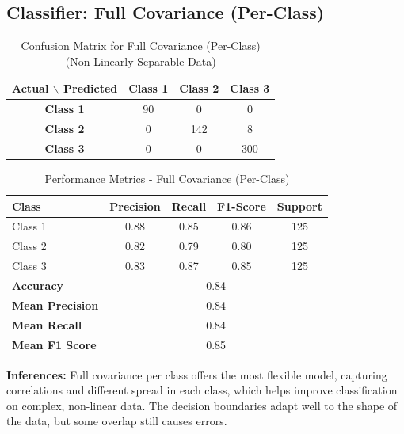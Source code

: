 \subsection{Classifier: Full Covariance (Per-Class)}


\begin{table}[H]
\centering
\caption{Confusion Matrix for Full Covariance (Per-Class) (Non-Linearly Separable Data)}
\label{tab:confmat_d3_sigma2I}
\begin{tabular}{|c|c|c|c|}
\hline
\textbf{Actual $\backslash$ Predicted} & \textbf{Class 1} & \textbf{Class 2} & \textbf{Class 3} \\
\hline
\textbf{Class 1} & 90 & 0   & 0   \\
\textbf{Class 2} & 0  & 142 & 8   \\
\textbf{Class 3} & 0   & 0   & 300 \\
\hline
\end{tabular}
\end{table}


\begin{table}[H]
\centering
\caption{Performance Metrics - Full Covariance (Per-Class)}
\begin{tabular}{lcccc}
\toprule
\textbf{Class} & \textbf{Precision} & \textbf{Recall} & \textbf{F1-Score} & \textbf{Support} \\
\midrule
Class 1 & 0.88 & 0.85 & 0.86 & 125 \\
Class 2 & 0.82 & 0.79 & 0.80 & 125 \\
Class 3 & 0.83 & 0.87 & 0.85 & 125 \\
\midrule
\textbf{Accuracy} & \multicolumn{4}{c}{0.84} \\
\textbf{Mean Precision} & \multicolumn{4}{c}{0.84} \\
\textbf{Mean Recall} & \multicolumn{4}{c}{0.84} \\
\textbf{Mean F1 Score} & \multicolumn{4}{c}{0.85} \\
\bottomrule
\end{tabular}
\end{table}

\textbf{Inferences:}  
Full covariance per class offers the most flexible model, capturing correlations and different spread in each class, which helps improve classification on complex, non-linear data. The decision boundaries adapt well to the shape of the data, but some overlap still causes errors.

